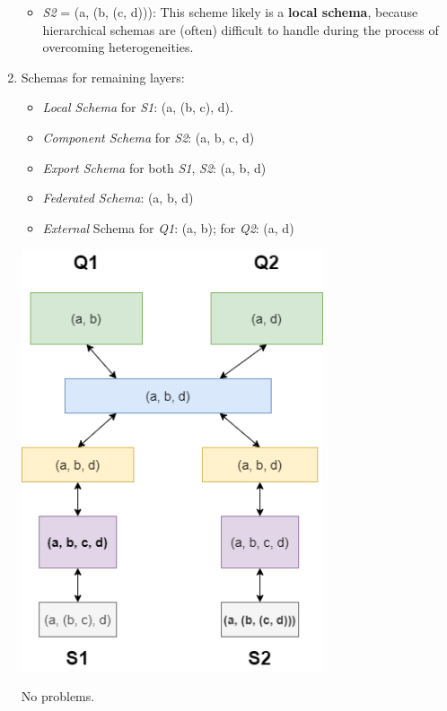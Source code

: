 \documentclass{scrartcl}
\begin{document}
\begin{enumerate}
\begin{itemize}
			\item \textit{S2} = (a, (b, (c, d))): This scheme likely is a \textbf{local schema}, because hierarchical schemas are (often) difficult to handle during the process of overcoming heterogeneities.
		\end{itemize}
	
		\item Schemas for remaining layers:
		\begin{itemize}
			\item \textit{Local Schema} for \textit{S1}: (a, (b, c), d).
			\item \textit{Component Schema} for \textit{S2}: (a, b, c, d)
			\item \textit{Export Schema} for both \textit{S1}, \textit{S2}: (a, b, d)
			\item \textit{Federated Schema}: (a, b, d)
			\item \textit{External} Schema for \textit{Q1}: (a, b); for \textit{Q2}: (a, d)
		\end{itemize}
		\begin{center}
			\includegraphics[width=0.7\textwidth]{figures/Task3_c_Visualization.png}
		\end{center}
		No problems.
	\end{enumerate}
	
\end{document}
